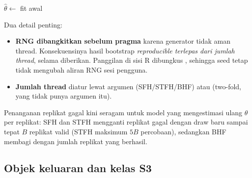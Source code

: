 \begin{algorithm}[htbp]
\caption{Kerangka bootstrap parametrik paralel (sesuai \texttt{eblup\_sfh\_pbmse.cpp}).}
\label{alg:bootstrap}
$\hat\theta\leftarrow$ fit awal\;
\caption*{Akumulasi: $\widehat{\mathrm{MSE}}=B^{-1}\sum_b(\hat\theta_b^\ast-\theta_b^\ast)^2$;
versi bias-koreksi pada teks SFH.}
\end{algorithm}

Dua detail penting:

\begin{itemize}
  \item \textbf{RNG dibangkitkan sebelum pragma} karena generator  tidak
        aman thread. Konsekuensinya hasil bootstrap \emph{reproducible
        terlepas dari jumlah thread}, selama  diberikan. Panggilan
        di sisi R dibungkus , sehingga seed tetap tidak
        mengubah aliran RNG sesi pengguna.
  \item \textbf{Jumlah thread} diatur lewat argumen 
        (SFH/STFH/BHF) atau  (two-fold, yang tidak
        punya argumen itu).
\end{itemize}

Penanganan replikat gagal kini seragam untuk model yang mengestimasi ulang
$\theta$ per replikat: SFH dan STFH mengganti replikat gagal dengan draw baru
sampai tepat $B$ replikat valid (STFH maksimum $5B$ percobaan), sedangkan BHF
membagi dengan jumlah replikat yang berhasil.

\subsection{Objek keluaran dan kelas S3}\label{sec:kelas}

